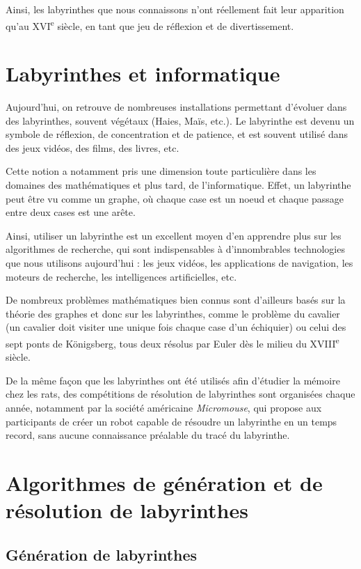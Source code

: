 \documentclass[12pt]{scrreprt} %
\begin{document}
Ainsi, les labyrinthes que nous connaissons n'ont réellement fait leur apparition qu'au XVI\textsuperscript{e} siècle\cite{McCullough2004}, en tant que jeu de réflexion et de divertissement.

\section{Labyrinthes et informatique}

Aujourd'hui, on retrouve de nombreuses installations permettant d'évoluer dans des labyrinthes, souvent végétaux (Haies, Maïs, etc.). Le labyrinthe est devenu un symbole de réflexion, de concentration et de patience, et est souvent utilisé dans des jeux vidéos, des films, des livres, etc.

Cette notion a notamment pris une dimension toute particulière dans les domaines des mathématiques et plus tard, de l'informatique. Effet, un labyrinthe peut être vu comme un graphe, où chaque case est un noeud et chaque passage entre deux cases est une arête.

Ainsi, utiliser un labyrinthe est un excellent moyen d'en apprendre plus sur les algorithmes de recherche, qui sont indispensables à d'innombrables technologies que nous utilisons aujourd'hui : les jeux vidéos, les applications de navigation, les moteurs de recherche, les intelligences artificielles, etc.

De nombreux problèmes mathématiques bien connus sont d'ailleurs basés sur la théorie des graphes et donc sur les labyrinthes, comme le problème du cavalier (un cavalier doit visiter une unique fois chaque case d'un échiquier) ou celui des sept ponts de Königsberg, tous deux résolus par Euler dès le milieu du XVIII\textsuperscript{e} siècle\cite{Alexanderson2006}\cite{Euler1759}.

De la même façon que les labyrinthes ont été utilisés afin d'étudier la mémoire chez les rats, des compétitions de résolution de labyrinthes sont organisées chaque année, notamment par la société américaine \textit{Micromouse}, qui propose aux participants de créer un robot capable de résoudre un labyrinthe en un temps record, sans aucune connaissance préalable du tracé du labyrinthe.\cite{Veritasium2023}

\section{Algorithmes de génération et de résolution de labyrinthes}

\subsection{Génération de labyrinthes}
\end{document}
